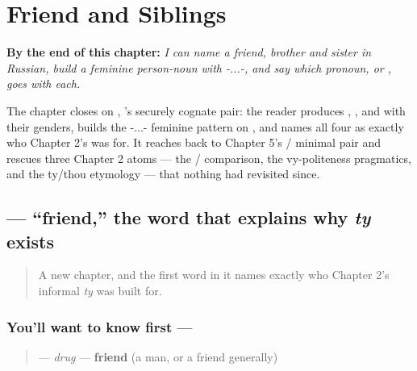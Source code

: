 
\chapter{Friend and Siblings}
\label{ch:russian-friend-and-siblings}

\begin{chapteropening}
\textbf{By the end of this chapter:} \emph{I can name a friend, brother and sister in Russian, build a feminine person-noun with -...-, and say which pronoun,  or , goes with each.}

The chapter closes on , 's securely cognate pair: the reader produces , ,  and  with their genders, builds the -...- feminine pattern on , and names all four as exactly who Chapter 2's  was for. It reaches back to Chapter 5's / minimal pair and rescues three Chapter 2 atoms — the / comparison, the vy-politeness pragmatics, and the ty/thou etymology — that nothing had revisited since.
\end{chapteropening}

\section[\texorpdfstring{\ru{друг} (drug)}{друг (drug)}]{ — \textquotedblleft{}friend,\textquotedblright{} the word that explains why \emph{ty} exists}

\label{lesson:RU-C07-drug}



\begin{quote}
A new chapter, and the first word in it names exactly who Chapter 2's informal \emph{ty} was built for.
\end{quote}

\subsection*{You'll want to know first — }
\begin{quote}
\textbf{} — \emph{drug} — \textbf{friend} (a man, or a friend generally)
\end{quote}

